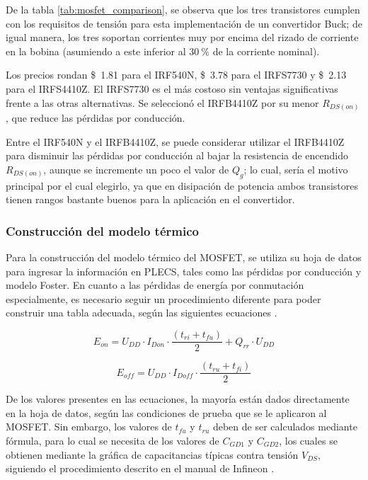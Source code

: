 \documentclass[journal]{IEEEtran}
\begin{document}
De la tabla \ref{tab:mosfet_comparison}, se observa que los tres transistores cumplen con los requisitos de tensión para esta
implementación de un convertidor Buck; de igual manera, los tres soportan corrientes muy por encima del rizado de corriente en la bobina
(asumiendo a este inferior al $30~\%$ de la corriente nominal).

\setlength{\parskip}{1em}

Los precios rondan \$~1.81 para el IRF540N, \$~3.78 para el IRFS7730 y \$~2.13 para el IRFS4410Z. El IRFS7730 es el más costoso sin ventajas significativas frente a las otras alternativas. Se seleccionó el IRFB4410Z por su menor $R_{DS(on)}$, que reduce las pérdidas por conducción.

\setlength{\parskip}{1em}

Entre el IRF540N y el IRFB4410Z, se puede considerar utilizar el IRFB4410Z para disminuir las pérdidas por conducción al bajar la resistencia de encendido
$R_{DS(on)}$, aunque se incremente un poco el valor de $Q_{g}$; lo cual, sería el motivo principal por el cual elegirlo, ya que en disipación de potencia 
ambos transistores tienen rangos bastante buenos para la aplicación en el convertidor. 


    \subsubsection{Construcción del modelo térmico}
    Para la construcción del modelo térmico del MOSFET, se utiliza su hoja de datos para ingresar la información 
    en PLECS, tales como las pérdidas por conducción y modelo Foster. En cuanto a las pérdidas de energía por conmutación especialmente, 
    es necesario seguir un procedimiento diferente para poder construir una tabla adecuada, según las siguientes ecuaciones \cite{InfineonMOSFETLosses2006}.

    \begin{equation}
        E_{on} = U_{DD} \cdot I_{Don} \cdot \frac{(t_{ri} + t_{fu})}{2} + Q_{rr} \cdot U_{DD}
        \label{eq:Eon_losses}
    \end{equation}

    \begin{equation}
        E_{off} = U_{DD} \cdot I_{Doff} \cdot \frac{(t_{ru} + t_{fi})}{2}
        \label{eq:Eoff_losses}
    \end{equation}

    De los valores presentes en las ecuaciones, la mayoría están dados directamente en la hoja de datos, según las condiciones de prueba
    que se le aplicaron al MOSFET. Sin embargo, los valores de $t_{fu}$ y $t_{ru}$ deben de ser calculados mediante fórmula, para lo cual 
    se necesita de los valores de $C_{GD1}$ y $C_{GD2}$, los cuales se obtienen mediante la gráfica de capacitancias
    típicas contra tensión $V_{DS}$, siguiendo el procedimiento descrito en el manual de Infineon \cite{InfineonMOSFETLosses2006}.
\end{document}
